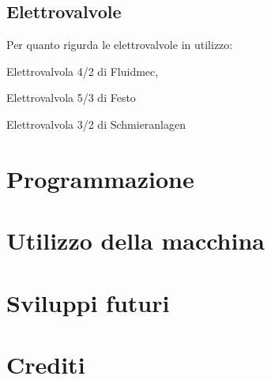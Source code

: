 \documentclass{report}
\begin{document}
\subsection{Elettrovalvole}
\begin{description}
Per quanto rigurda le elettrovalvole in utilizzo:
\item Elettrovalvola 4/2 di Fluidmec,  
\item Elettrovalvola 5/3 di Festo
\item Elettrovalvola 3/2 di Schmieranlagen
\end{description} 

\section{Programmazione}

\section{Utilizzo della macchina}

\section{Sviluppi futuri}

\section{Crediti}
\end{document}
